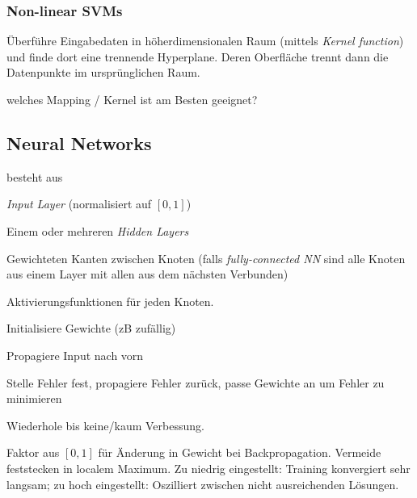 \documentclass[10pt]{article} %
\begin{document}
\subsubsection{Non-linear SVMs} 
Überführe Eingabedaten in höherdimensionalen Raum (mittels \textit{Kernel
  function}) und finde dort eine trennende Hyperplane. Deren Oberfläche trennt
dann die Datenpunkte im ursprünglichen Raum.

\begin{cptitemize}
\disadvantageit welches Mapping / Kernel ist am Besten geeignet?
\end{cptitemize}


\subsection{Neural Networks}

\begin{definition} besteht aus
  \begin{cptitemize}
    \item \textit{Input Layer} (normalisiert auf $[0,1]$)
    \item Einem oder mehreren \textit{Hidden Layers}
      \item Gewichteten Kanten zwischen Knoten (falls \textit{fully-connected
          NN} sind alle Knoten aus einem Layer mit allen aus dem nächsten
        Verbunden)
        \item Aktivierungsfunktionen für jeden Knoten.
  \end{cptitemize}  
\end{definition}

\begin{definition}[Backpropagation]
\begin{cptenumerate}
\item Initialisiere Gewichte (zB zufällig)
\item Propagiere Input nach vorn
  \item Stelle Fehler fest, propagiere Fehler zurück, passe Gewichte an um
    Fehler zu minimieren
    \item Wiederhole bis keine/kaum Verbessung.
\end{cptenumerate}
\end{definition}

\begin{definition}
  Faktor aus $[0,1]$ für Änderung in Gewicht bei Backpropagation. Vermeide
  feststecken in localem Maximum. Zu niedrig eingestellt: Training konvergiert
  sehr langsam; zu hoch eingestellt: Oszilliert zwischen nicht ausreichenden Lösungen.
\end{definition}
\end{document}

